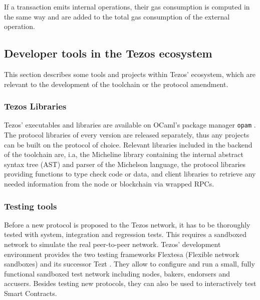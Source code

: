 If a transaction emits internal operations, their gas consumption is computed in the same way and are added to the total gas consumption of the external operation.

\subsection{Developer tools in the Tezos ecosystem}
This section describes some tools and projects within Tezos' ecosystem, which are relevant to the development of the toolchain or the protocol amendment.

\subsubsection{Tezos Libraries}
Tezos' executables and libraries are available on OCaml's package manager \texttt{opam} \cite{tezos_opam}. The protocol libraries of every version are released separately, thus any projects can be built on the protocol of choice. Relevant libraries included in the backend of the toolchain are, i.a, the Micheline library containing the internal abstract syntax tree (AST) and parser of the Michelson language, the protocol libraries providing functions to type check code or data, and client libraries to retrieve any needed information from the node or blockchain via wrapped RPCs.

\subsubsection{Testing tools}
Before a new protocol is proposed to the Tezos network, it has to be thoroughly tested with system, integration and regression tests. This requires a sandboxed network to simulate the real peer-to-peer network. Tezos' development environment provides the two testing frameworks Flextesa (Flexible network sandboxes)\cite{tezos_docs} and its successor Tezt \cite{tezos_docs}. They allow to configure and run a small, fully functional sandboxed test network including nodes, bakers, endorsers and accusers. Besides testing new protocols, they can also be used to interactively test Smart Contracts.

